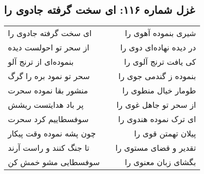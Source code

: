 \begin{center}
\section*{غزل شماره ۱۱۶: ای سخت گرفته جادوی را}
\label{sec:0116}
\begin{longtable}{l p{0.5cm} r}
ای سخت گرفته جادوی را
&&
شیری بنموده آهوی را
\\
از سحر تو احولست دیده
&&
در دیده نهاده‌ای دوی را
\\
بنموده‌ای از ترنج آلو
&&
کی یافت ترنج آلوی را
\\
سحر تو نمود بره را گرگ
&&
بنموده ز گندمی جوی را
\\
منشور بقا نموده سحرت
&&
طومار خیال منطوی را
\\
پر باد هدایتست ریشش
&&
از سحر تو جاهل غوی را
\\
سوفسطاییم کرد سحرت
&&
ای ترک نموده هندوی را
\\
چون پشه نموده وقت پیکار
&&
پیلان تهمتن قوی را
\\
تا جنگ کنند و راست آرند
&&
تقدیر و قضای مستوی را
\\
سوفسطایی مشو خمش کن
&&
بگشای زبان معنوی را
\\
\end{longtable}
\end{center}
